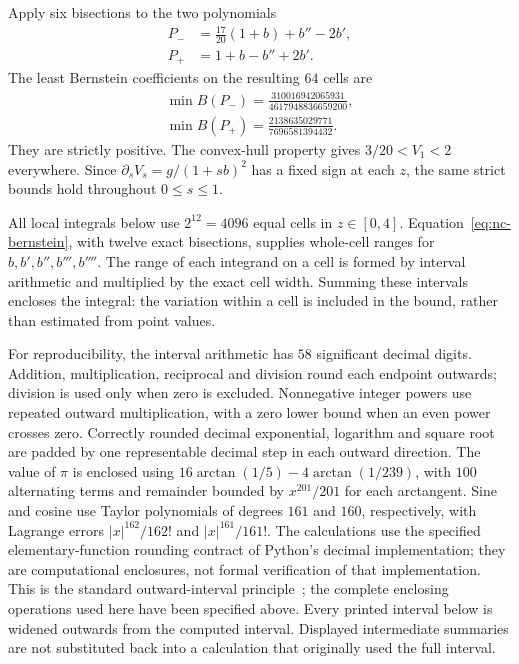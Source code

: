 \documentclass[aps,pra,reprint,superscriptaddress,longbibliography]{revtex4-2}
\begin{document}
Apply six bisections to the two polynomials
\begin{align}
 P_-&=\tfrac{17}{20}(1+b)+b''-2b',\nonumber\\
 P_+&=1+b-b''+2b'.
 \label{eq:nc-positive}
\end{align}
The least Bernstein coefficients on the resulting $64$ cells are
\begin{equation}
 \begin{gathered}
 \min B(P_-)=\frac{310016942065931}{4617948836659200},
 \\
 \min B(P_+)=\frac{2138635029771}{7696581394432}.
 \end{gathered}
 \label{eq:nc-positive-values}
\end{equation}
They are strictly positive.  The convex-hull property gives
$3/20<V_{1}<2$ everywhere.  Since
$\partial_sV_s=g/(1+sb)^2$ has a fixed sign at each $z$,
the same strict bounds hold throughout $0\le s\le1$.

All local integrals below use $2^{12}=4096$ equal cells in $z\in[0,4]$.
Equation~\eqref{eq:nc-bernstein}, with twelve exact bisections, supplies
whole-cell ranges for $b,b',b'',b''',b''''$.  The range of each
integrand on a cell is formed by interval arithmetic and multiplied by
the exact cell width.  Summing these intervals encloses the integral:
the variation within a cell is included in the bound, rather than
estimated from point values.

For reproducibility, the interval arithmetic has $58$ significant decimal
digits.  Addition, multiplication, reciprocal and division round each
endpoint outwards; division is used only when zero is excluded.
Nonnegative integer powers use repeated outward multiplication, with a
zero lower bound when an even power crosses zero.
Correctly rounded decimal exponential, logarithm and square root are
padded by one representable decimal step in each outward direction.
The value of $\pi$ is enclosed using
$16\arctan(1/5)-4\arctan(1/239)$, with $100$ alternating terms and
remainder bounded by $x^{201}/201$ for each arctangent.
Sine and cosine use Taylor polynomials of degrees $161$ and $160$,
respectively, with Lagrange errors
$|x|^{162}/162!$ and $|x|^{161}/161!$.
The calculations use the specified elementary-function rounding
contract of Python's decimal implementation; they are computational
enclosures, not formal verification of that implementation.
This is the standard outward-interval principle~\cite{MooreInterval};
the complete enclosing operations used here have been specified above.
Every printed interval below is widened outwards from the computed
interval.  Displayed intermediate summaries are not substituted back
into a calculation that originally used the full interval.
\end{document}
